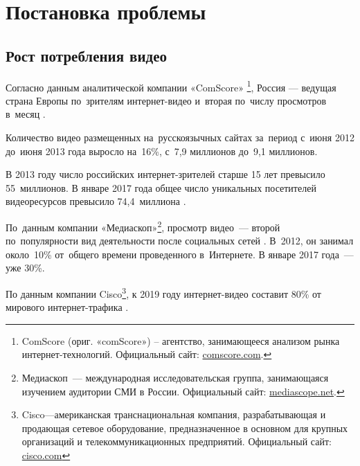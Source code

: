 \documentclass{.local/lib/classes/ndvr-super-article-standalone}
\begin{document}
    \section{Постановка проблемы}


    \subsection{Рост потребления видео}

    Согласно данным аналитической компании «ComScore»
    \footnote{
        ComScore (ориг. «comScore») – 
        агентство, занимающееся анализом рынка интернет-технологий.
        Официальный сайт: \href{http://comScore.com}{comscore.com}.
    },
    Россия — ведущая страна Европы по~зрителям интернет-видео
    и~вторая по~числу просмотров в~месяц \cite{Henni:2013}.

    Количество видео размещенных на~русскоязычных
    сайтах за~период с~июня 2012 до~июня 2013 года выросло
    на~16\%, с~7,9 миллионов до~9,1 миллионов.

    В 2013 году число российских интернет-зрителей 
    старше 15 лет превысило 55~миллионов\cite{Onishenko:2013}. 
    В январе 2017 года общее число уникальных 
    посетителей видеоресурсов 
    превысило 74,4~миллиона \cite{Tagiev:2017}.

    По~данным компании «Медиаскоп»\footnote{
        Медиаскоп~— международная исследовательская группа,
        занимающаяся изучением аудитории СМИ в России.
        Официальный сайт: \href{http://mediascope.net}{mediascope.net}.
    },
    просмотр видео~— второй по~популярности
    вид деятельности после социальных сетей \cite{Henni:2013}.
    В~2012, он занимал около~10\% от~общего 
    времени проведенного в~Интернете. 
    В январе 2017 года~— уже 30\%.

    По данным компании Cisco\footnote{
        Cisco—американская транснациональная компания, 
        разрабатывающая и продающая сетевое оборудование, 
        предназначенное в основном для крупных организаций 
        и телекоммуникационных предприятий.
        Официальный сайт: \href{https://www.cisco.com/}{cisco.com}
    }, к 2019 году интернет-видео составит 80\% 
    от мирового интернет-трафика \cite{CiscoForecast:2017}.
\end{document}
